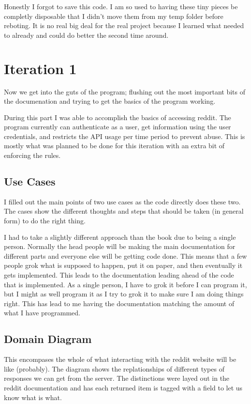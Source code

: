 \documentclass[12pt]{article}
\begin{document}
Honestly I forgot to save this code.
I am so used to having these tiny pieces be completly disposable that I didn't move them from my temp folder before reboting.
It is no real big deal for the real project because I learned what needed to already and could do better the second time around.

\section{Iteration 1}

Now we get into the guts of the program; flushing out the most important bits of the documenation and trying to get the basics of the program working.

During this part I was able to accomplish the basics of accessing reddit.
The program currently can authenticate as a user, get information using the user credentials, and restricts the API usage per time period to prevent abuse.
This is mostly what was planned to be done for this iteration with an extra bit of enforcing the rules.

\subsection{Use Cases}

I filled out the main points of two use cases as the code directly does these two.
The cases show the different thoughts and steps that should be taken (in general form) to do the right thing.

I had to take a slightly different approach than the book due to being a single person.
Normally the head people will be making the main documentation for different parts and everyone else will be getting code done.
This means that a few people grok what is supposed to happen, put it on paper, and then eventually it gets implemented.
This leads to the documentation leading ahead of the code that is implemented.
As a single person, I have to grok it before I can program it, but I might as well program it as I try to grok it to make sure I am doing things right.
This has lead to me having the documentation matching the amount of what I have programmed.

\subsection{Domain Diagram}

This encompases the whole of what interacting with the reddit website will be like (probably).
The diagram shows the replationships of different types of responses we can get from the server.
The distinctions were layed out in the reddit documentation and has each returned item is tagged with a field to let us know what is what.
\end{document}
